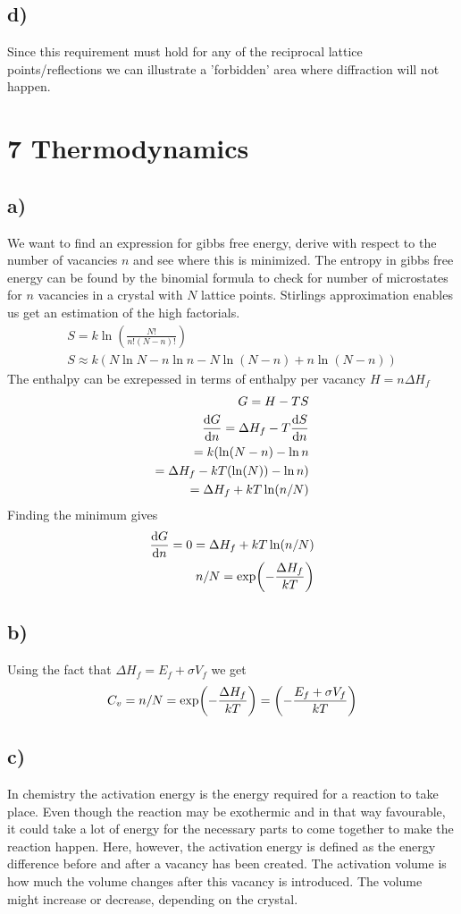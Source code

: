\documentclass[a4paper, 11pt]{article}
\begin{document}
		\subsection*{d)}
			Since this requirement must hold for any of the reciprocal lattice points/reflections we can illustrate a 'forbidden' area where diffraction will not happen.
	\section*{7 Thermodynamics}
		\subsection*{a)}
			We want to find an expression for gibbs free energy, derive with respect to the number of vacancies $n$ and see where this is minimized. The entropy in gibbs free energy can be found by the binomial formula to check for number of microstates for $n$ vacancies in a crystal with $N$ lattice points. Stirlings approximation enables us get an estimation of the high factorials.
			\begin{align*}
				S = k\ln(\frac{N!}{n!(N-n)!})\\
				S \approx k(N\ln N -n\ln n - N\ln(N-n) + n\ln(N-n))
			\end{align*}
			The enthalpy can be exrepessed in terms of enthalpy per vacancy $H=n\Delta H_f$
			\begin{align*}
				G = H-TS\\
				\dv{G}{n}=\Delta H_f -T\dv{S}{n}\\
				=k(\ln(N-n)-\ln n\\
				=\Delta H_f-kT(\ln(N))-\ln n)\\
				=\Delta H_f + kT \ln(n/N)
			\end{align*}
			Finding the minimum gives
			\begin{align*}
				\dv{G}{n} = 0=\Delta H_f + kT \ln(n/N)\\
				n/N = \exp(-\frac{\Delta H_f}{kT})
			\end{align*}
		\subsection*{b)}
			Using the fact that $\Delta H_f =E_f+ \sigma V_f$ we get
			\begin{align*}
				C_v = n/N = \exp(-\frac{\Delta H_f}{kT})=\qty(-\frac{E_f+ \sigma V_f}{kT})
			\end{align*}
		\subsection*{c)}
			In chemistry the activation energy is the energy required for a reaction to take place. Even though the reaction may be exothermic and in that way favourable, it could take a lot of energy for the necessary parts to come together to make the reaction happen. Here, however, the activation energy is defined as the energy difference before and after a vacancy has been created. The activation volume is how much the volume changes after this vacancy is introduced. The volume might increase or decrease, depending on the crystal.
\end{document}
